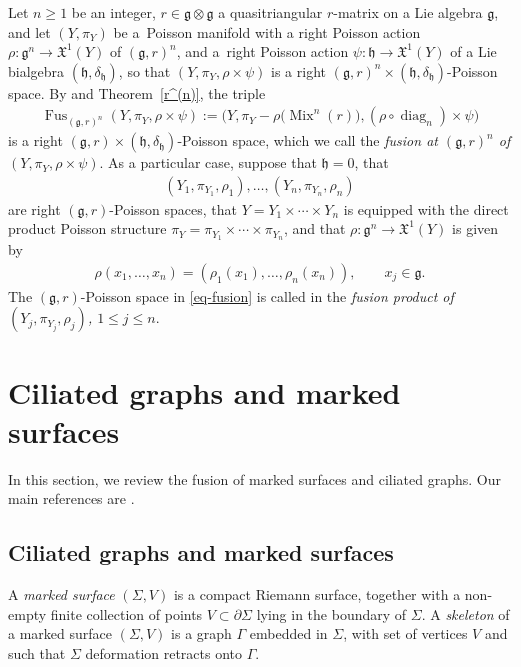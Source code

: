 \documentclass[pdftex]{sigma}
\numberwithin{equation}{section}
\newcommand{\XX}{\mathfrak{X}}
\def \g {\mathfrak{a}}
\def \g {\mathfrak{g}}
\def \h {\mathfrak{h}}
\DeclareMathOperator{\diag}{diag}
\DeclareMathOperator{\Mix}{Mix}
\DeclareMathOperator{\Fus}{Fus}
\def \sY {{\scriptscriptstyle Y}}
\newcommand{\del}{\partial}
\newcommand{\piY}{{\pi_{\scriptscriptstyle Y}}}
\begin{document}
Let $n \geq 1$ be an integer, $r \in \g \otimes \g$ a quasitriangular $r$-matrix on a Lie algebra $\g$, and let $(Y, \piY)$ be a~Poisson manifold with a right Poisson action $\rho\colon \g^n \to \XX^1(Y)$ of $(\g, r)^n$, and a~right Poisson action $\psi\colon \h \to \XX^1(Y)$ of a Lie bialgebra $(\h, \delta_\h)$, so that $(Y, \piY, \rho \times \psi)$ is a right $(\g, r)^n \times (\h, \delta_\h)$-Poisson space. By \cite[Lemma~2.16]{Lu-Mou:mixed} and Theorem~\ref{r^(n)}, the triple
\begin{gather}
\Fus_{(\g, r)^n}(Y, \piY, \rho \times \psi) := \big(Y, \piY - \rho\big(\Mix^n(r)\big), (\rho \circ \diag_n) \times \psi \big) \label{eq-fusion}
\end{gather}
is a right $(\g, r) \times (\h, \delta_\h)$-Poisson space, which we call the {\it fusion at $(\g, r)^n$ of $(Y, \piY, \rho \times \psi)$}. As a particular case, suppose that $\h=0$, that
\begin{gather*}
(Y_1, \pi_{\sY_1}, \rho_1), \ldots, (Y_n, \pi_{\sY_n}, \rho_n)
\end{gather*}
are right $(\g, r)$-Poisson spaces, that $Y = Y_1 \times \cdots \times Y_n$ is equipped with the direct product Poisson structure $\piY = \pi_{\sY_1} \times \cdots \times \pi_{\sY_n}$, and that $\rho\colon \g^n \to \XX^1(Y)$ is given by
\begin{gather*}
\rho(x_1, \ldots, x_n) = (\rho_1(x_1), \ldots, \rho_n(x_n)), \qquad x_j \in \g.
\end{gather*}
The $(\g, r)$-Poisson space in \eqref{eq-fusion} is called in \cite{Lu-Mou:mixed} the {\it fusion product of $(Y_j, \pi_{\sY_j}, \rho_j)$, $1 \leq j \leq n$}.

\section{Ciliated graphs and marked surfaces} \label{sec-graphs&surfaces}

In this section, we review the fusion of marked surfaces and ciliated graphs. Our main references are \cite{FR1, LBS1}.

\subsection{Ciliated graphs and marked surfaces} \label{subsec-ciliated}

A {\it marked surface} $(\Sigma, V)$ is a compact Riemann surface, together with a non-empty f\/inite collection of points $V \subset \del \Sigma$ lying in the boundary of $\Sigma$. A {\it skeleton} of a marked surface $(\Sigma, V)$ is a graph $\Gamma$ embedded in $\Sigma$, with set of vertices $V$ and such that $\Sigma$ deformation retracts onto $\Gamma$.
\end{document}
